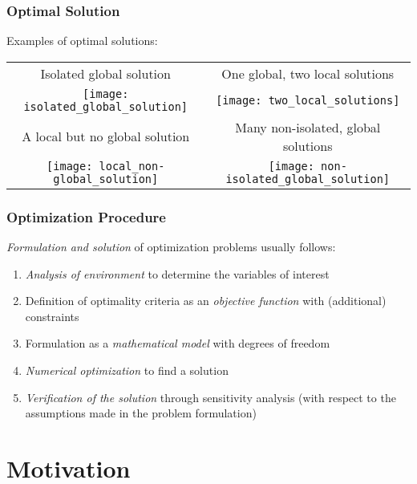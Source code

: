 \documentclass[%
  final,
  11pt, 
  show notes, %
  t, %
  fleqn, %
]{beamer}
\begin{document}
\begin{frame}[fragile]
  \frametitle{Optimal Solution}
Examples of optimal solutions:

\vspace*{0.4cm}
\begin{tabular}{cc}
Isolated global solution & One global, two local solutions \\
\texttt{[image: isolated\_global\_solution]} & \texttt{[image: two\_local\_solutions]} \\
A local but no global solution & Many non-isolated, global solutions \\
\texttt{[image: local\_non-global\_solution]} & \texttt{[image: non-isolated\_global\_solution]}
\end{tabular}
\end{frame}

\begin{frame}[fragile]
  \frametitle{Optimization Procedure}
\emph{Formulation and solution} of optimization problems usually follows:
\begin{enumerate}
\item \emph{Analysis of environment} to determine the variables of interest
\item Definition of optimality criteria as an \emph{objective function} with (additional) constraints
\item Formulation as a \emph{mathematical model} with degrees of freedom
\item \emph{Numerical optimization} to find a solution
\item \emph{Verification of the solution} through sensitivity analysis (with respect to the assumptions made in the problem formulation)
\end{enumerate}
\end{frame}

\section{Motivation}

\end{document}
